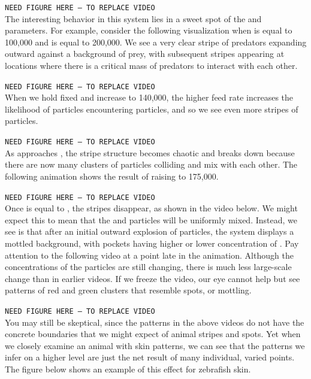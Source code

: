 {\texttt{NEED FIGURE HERE -- TO REPLACE VIDEO}\\

The interesting behavior in this system lies in a sweet spot of the  and  parameters. For example, consider the following visualization when  is equal to 100,000 and  is equal to 200,000. We see a very clear stripe of predators expanding outward against a background of prey, with subsequent stripes appearing at locations where there is a critical mass of predators to interact with each other.

\texttt{NEED FIGURE HERE -- TO REPLACE VIDEO}\\

When we hold  fixed and increase  to 140,000, the higher feed rate increases the likelihood of  particles encountering  particles, and so we see even more stripes of  particles.

\texttt{NEED FIGURE HERE -- TO REPLACE VIDEO}\\

As  approaches , the stripe structure becomes chaotic and breaks down because there are now many clusters of  particles colliding and mix with each other. The following animation shows the result of raising  to 175,000.

\texttt{NEED FIGURE HERE -- TO REPLACE VIDEO}\\

Once  is equal to , the stripes disappear, as shown in the video below. We might expect this to mean that the  and  particles will be uniformly mixed. Instead, we see is that after an initial outward explosion of  particles, the system displays a mottled background, with pockets having higher or lower concentration of . Pay attention to the following video at a point late in the animation. Although the concentrations of the particles are still changing, there is much less large-scale change than in earlier videos. If we freeze the video, our eye cannot help but see patterns of red and green clusters that resemble spots, or mottling.

\texttt{NEED FIGURE HERE -- TO REPLACE VIDEO}\\

You may still be skeptical, since the patterns in the above videos do not have the concrete boundaries that we might expect of animal stripes and spots. Yet when we closely examine an animal with skin patterns, we can see that the patterns we infer on a higher level are just the net result of many individual, varied points. The figure below shows an example of this effect for zebrafish skin.

}
